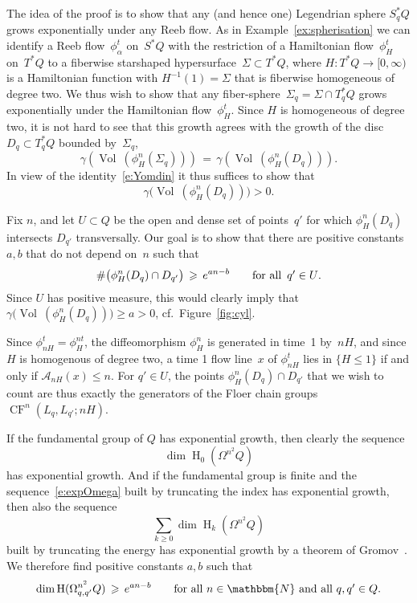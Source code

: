 \documentclass[12pt,twoside]{amsart}
\theoremstyle{plain}
\numberwithin{figure}{section}
\numberwithin{equation}{section}
\def\m{\medskip}
\def\Vol{\operatorname {Vol}\:\!}
\def\H{\operatorname{H}}
\def\CF{\operatorname{CF}}
\def\ga{\alpha}
\def\gg{\gamma}
\def\ca{{\mathcal A}}
\def\NN{\mathbbm{N}}
\def\m{\medskip}
\begin{document}
\m 
The idea of the proof is to show that any (and hence one) Legendrian sphere $S^*_qQ$
grows exponentially under any Reeb flow.
%
As in Example~\ref{ex:spherisation} we can identify a Reeb flow~$\phi_\ga^t$ on~$S^*Q$
with the restriction of a Hamiltonian flow~$\phi_H^t$ on~$T^*Q$ 
to a fiberwise starshaped hypersurface~$\Sigma \subset T^*Q$,
where $H \colon T^*Q \to [0,\infty)$ is a Hamiltonian function with 
$H^{-1}(1)=\Sigma$ that is fiberwise homogeneous of degree two.
We thus wish to show that any fiber-sphere~$\Sigma_q = \Sigma \cap T_q^*Q$ grows exponentially 
under the Hamiltonian flow~$\phi_H^t$.
Since $H$ is homogeneous of degree two, it is not hard to see that
this growth agrees with the growth of the disc $D_q \subset T_q^*Q$ 
bounded by~$\Sigma_q$,
$$
\gg (\Vol(\phi_H^n(\Sigma_q))) \,=\, \gg (\Vol(\phi_H^n(D_q))) .
$$
In view of the identity~\eqref{e:Yomdin} it thus suffices to show that
\begin{equation*} 
\gg \bigr( \Vol (\phi_H^n(D_q)) \bigr) >0.
\end{equation*}

Fix $n$, and let $U \subset Q$ be the open and dense set of points~$q'$ for which 
$\phi_H^n (D_q)$ intersects $D_{q'}$ transversally.
Our goal is to show that there are positive constants $a,b$ that do not depend on~$n$
such that  
\begin{equation*}
\# \bigl( \phi_H^n (D_q) \cap D_{q'} \bigr) \,\geqslant\, e^{an-b} \qquad 
\mbox{for all\, $q' \in U$.}
\end{equation*}
Since $U$ has positive measure, this would clearly imply that 
$\gg \bigl( \Vol (\phi_H^n(D_q)) \bigr) \geqslant a >0$,
cf.\ Figure~\ref{fig:cyl}.

Since $\phi_{nH}^t = \phi_H^{nt}$, the diffeomorphism $\phi_H^n$ is generated in time~1
by~$nH$,
and since $H$ is homogenous of degree two,
a time 1 flow line~$x$ of $\phi_{nH}^t$ lies in $\{ H \leqslant 1\}$ 
if and only if $\ca_{nH}(x) \leqslant n$.
For $q' \in U$, the points $\phi_H^n (D_q) \cap D_{q'}$ that we wish to count are thus exactly
the generators of the Floer chain groups $\CF^n (L_q , L_{q'}; nH)$.

If the fundamental group of $Q$ has exponential growth, then 
clearly the sequence
$$
\dim \H_0 (\Omega^{n^2} Q)
$$ 
has exponential growth.
And if the fundamental group is finite and the sequence~\eqref{e:expOmega} built by truncating the index 
has exponential growth, 
then also the sequence 
$$
\sum_{k \geqslant 0} \dim \H_k (\Omega^{n^2} Q)
$$ 
built by truncating the energy has exponential growth
by a theorem of Gromov~\cite{Gro78}. 
We therefore find positive constants $a,b$ such that
$$
\dim \H (\Omega_{q,q'}^{n^2}Q) \,\geqslant\, e^{an-b} \qquad \mbox{for all $n \in \NN$ and all $q,q' \in Q$.}
$$ 
\end{document}
